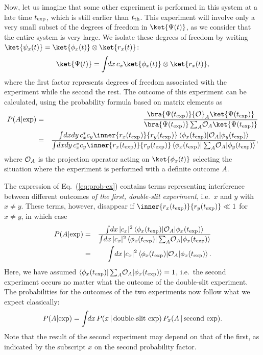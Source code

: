 \documentclass[12pt]{article}
\begin{document}
Now, let us imagine that some other experiment is performed in this system 
at a late time $t_{\rm exp}$, which is still earlier than $t_{\rm th}$. 
This experiment will involve only a very small subset of the degrees of 
freedom in $\ket{\Psi(t)}$, as we consider that the entire system is very 
large.  We isolate these degrees of freedom by writing $\ket{\psi_x(t)} 
= \ket{\phi_x(t)} \otimes \ket{r_x(t)}$:
%
\begin{equation}
  \ket{\Psi(t)} = \int\!\!dx\, c_x \ket{\phi_x(t)} \otimes \ket{r_x(t)},
\label{eq:Psi-exp}
\end{equation}
%
where the first factor represents degrees of freedom associated with the 
experiment while the second the rest.  The outcome of this experiment 
can be calculated, using the probability formula based on matrix 
elements as
%
\begin{eqnarray}
  P(A|{\rm exp}) &=& \frac{\bra{\Psi(t_{\rm exp})} 
      {\cal O}_A \ket{\Psi(t_{\rm exp})}} 
    {\bra{\Psi(t_{\rm exp})} \sum_A\! {\cal O}_A \ket{\Psi(t_{\rm exp})}}
\nonumber\\
  &=& \frac{\int\!dxdy\, c_x^* c_y \inner{r_x(t_{\rm exp})}{r_y(t_{\rm exp})} 
      \left< \phi_x(t_{\rm exp}) | {\cal O}_A | \phi_y(t_{\rm exp}) \right>} 
    {\int\!dxdy\, c_x^* c_y \inner{r_x(t_{\rm exp})}{r_y(t_{\rm exp})} 
      \left< \phi_x(t_{\rm exp}) | \sum_A\! {\cal O}_A 
      | \phi_y(t_{\rm exp}) \right>},
\label{eq:prob-ex}
\end{eqnarray}
%
where ${\cal O}_A$ is the projection operator acting on $\ket{\phi_x(t)}$ 
selecting the situation where the experiment is performed with a definite 
outcome $A$.

The expression of Eq.~(\ref{eq:prob-ex}) contains terms representing 
interference between different outcomes {\it of the first, double-slit 
experiment}, i.e.\ $x$ and $y$ with $x \neq y$.  These terms, however, 
disappear if $\inner{r_x(t_{\rm exp})}{r_y(t_{\rm exp})} \ll 1$ for 
$x \neq y$, in which case
%
\begin{eqnarray}
  P(A|{\rm exp}) &=& 
    \frac{\int\!dx\, |c_x|^2 \left< \phi_x(t_{\rm exp}) | 
      {\cal O}_A | \phi_x(t_{\rm exp}) \right>} 
    {\int\!dx\, |c_x|^2 \left< \phi_x(t_{\rm exp}) | 
      \sum_A\! {\cal O}_A | \phi_x(t_{\rm exp}) \right>}
\nonumber\\
  &=& \int\!dx\, |c_x|^2 \left< \phi_x(t_{\rm exp}) | 
      {\cal O}_A | \phi_x(t_{\rm exp}) \right>.
\label{eq:prob-ex-2}
\end{eqnarray}
%
Here, we have assumed $\left< \phi_x(t_{\rm exp}) | \sum_A\! {\cal O}_A | 
\phi_x(t_{\rm exp}) \right> = 1$, i.e.\ the second experiment occurs no 
matter what the outcome of the double-slit experiment.  The probabilities 
for the outcomes of the two experiments now follow what we expect 
classically:
%
\begin{equation}
  P(A|{\rm exp}) = \int\!\!dx\, P(x \,|\, \mbox{double-slit exp})\, 
    P_x(A \,|\, \mbox{second exp}).
\label{eq:P-classical}
\end{equation}
%
Note that the result of the second experiment may depend on that of 
the first, as indicated by the subscript $x$ on the second probability 
factor.
\end{document}
